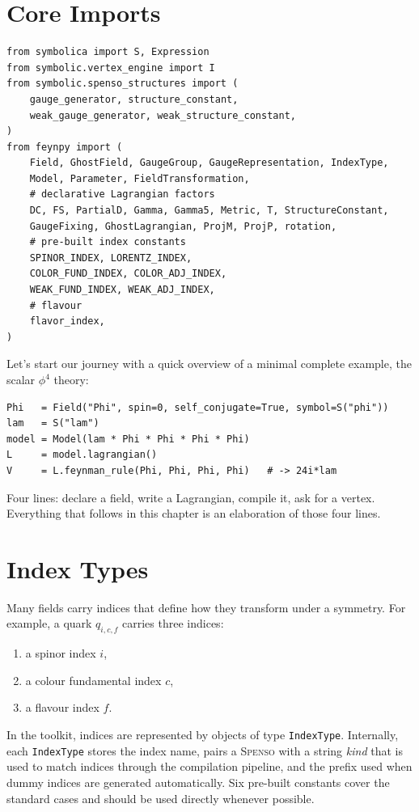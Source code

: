 \section{Core Imports}
\label{sec:feynpy-imports}

\begin{verbatim}
from symbolica import S, Expression
from symbolic.vertex_engine import I
from symbolic.spenso_structures import (
    gauge_generator, structure_constant,
    weak_gauge_generator, weak_structure_constant,
)
from feynpy import (
    Field, GhostField, GaugeGroup, GaugeRepresentation, IndexType,
    Model, Parameter, FieldTransformation,
    # declarative Lagrangian factors
    DC, FS, PartialD, Gamma, Gamma5, Metric, T, StructureConstant,
    GaugeFixing, GhostLagrangian, ProjM, ProjP, rotation,
    # pre-built index constants
    SPINOR_INDEX, LORENTZ_INDEX,
    COLOR_FUND_INDEX, COLOR_ADJ_INDEX,
    WEAK_FUND_INDEX, WEAK_ADJ_INDEX,
    # flavour
    flavor_index,
)
\end{verbatim}


\noindent Let's start our journey with a quick overview of a minimal complete example, the scalar $\phi^4$ theory:

\begin{verbatim}
Phi   = Field("Phi", spin=0, self_conjugate=True, symbol=S("phi"))
lam   = S("lam")
model = Model(lam * Phi * Phi * Phi * Phi)
L     = model.lagrangian()
V     = L.feynman_rule(Phi, Phi, Phi, Phi)   # -> 24i*lam
\end{verbatim}

\noindent Four lines: declare a field, write a Lagrangian, compile it, ask for
a vertex. Everything that follows in this chapter is an elaboration of those
four lines.

\section{Index Types}
\label{sec:feynpy-indices}

Many fields carry indices that define how they transform under a symmetry. For example, a quark $q_{i,c,f}$ carries three indices:
\begin{enumerate}
    \item a spinor index $i$,
    \item a colour fundamental index $c$,
    \item a flavour index $f$.
\end{enumerate}
In the toolkit, indices are represented by objects of type \texttt{IndexType}.
Internally, each \texttt{IndexType} stores the index name, pairs a \textsc{Spenso}  with a string \emph{kind} that is used to match indices through the compilation pipeline, and the prefix used when dummy indices are generated automatically. Six pre-built constants cover the standard cases and should be used directly whenever possible.




